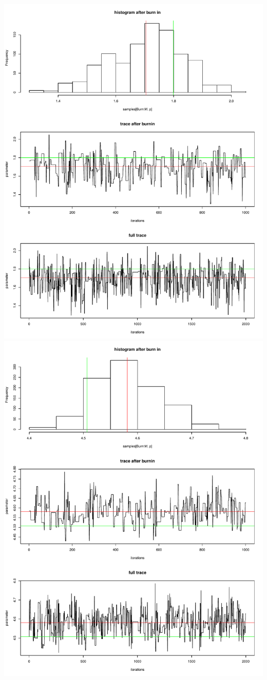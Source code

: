 \documentclass[a4paper,12pt]{scrartcl} %
\begin{document}
\includegraphics[scale=0.4]{15}
\includegraphics[scale=0.4]{16}
\end{document}

